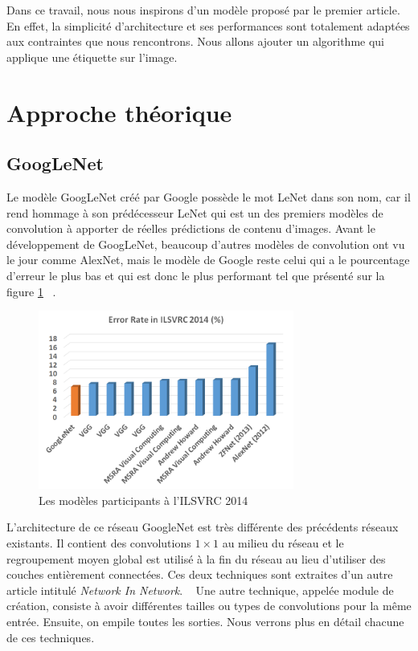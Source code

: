 \documentclass{article}
\begin{document}
Dans ce travail, nous nous inspirons d'un modèle proposé par le premier article.
En effet, la simplicité d’architecture et ses performances sont totalement
adaptées aux contraintes que nous rencontrons. Nous allons ajouter un algorithme
qui applique une étiquette sur l'image.

\section{Approche théorique}

\subsection{GoogLeNet}
Le modèle GoogLeNet créé par Google possède le mot LeNet dans son nom, car il
rend hommage à son prédécesseur LeNet qui est un des premiers modèles de
convolution à apporter de réelles prédictions de contenu d’images. Avant le
développement de GoogLeNet,  beaucoup d’autres modèles de convolution ont vu le
jour comme AlexNet, mais le modèle de Google reste celui qui a le pourcentage
d’erreur le plus bas et qui est donc le plus performant tel que présenté
sur la figure \ref{2} ~\cite{tsang_2018}.

\begin{figure}[htbp]
    \includegraphics[width=8.4cm]{./figures/Figure1.png} 
    \caption{Les modèles participants à l'ILSVRC 2014}
    \label{2} 
\end{figure} 

L'architecture de ce réseau GoogleNet est très différente des précédents réseaux
existants. Il contient des convolutions $1\times 1$ au milieu du réseau et le
regroupement moyen global est utilisé à la fin du réseau au lieu d’utiliser des
couches entièrement connectées. Ces deux techniques sont extraites d’un autre
article intitulé \textit{Network In Network}. ~\cite{lin2013network} Une autre
technique, appelée module de création, consiste à avoir différentes tailles ou
types de convolutions pour la même entrée. Ensuite, on empile toutes les 
sorties. Nous verrons plus en détail chacune de ces techniques.
\end{document}
